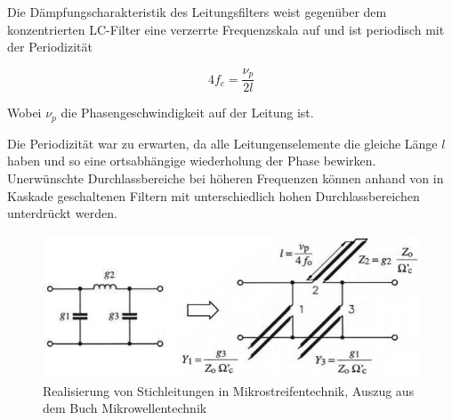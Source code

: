 Die  D\"ampfungscharakteristik  des   Leitungsfilters  weist  gegen\"uber  dem
konzentrierten  LC-Filter eine verzerrte Frequenzskala auf und ist  periodisch
mit der Periodizit\"at

\begin{equation}
    4f_c = \frac{\nu_p}{2l}
\end{equation}

Wobei $\nu_p$ die Phasengeschwindigkeit auf der Leitung ist.

Die Periodizit\"at war  zu  erwarten,  da  alle Leitungenselemente die gleiche
L\"ange $l$ haben und so eine ortsabh\"angige wiederholung der Phase bewirken.
Unerw\"unschte Durchlassbereiche bei  h\"oheren Frequenzen k\"onnen anhand von
in Kaskade geschaltenen Filtern mit unterschiedlich  hohen  Durchlassbereichen
unterdr\"uckt werden.

\begin{figure}[h!]
    \centering
    \includegraphics[width=\imagewidth]{images/LC-zu-Leitungsfilter}
    \caption{Realisierung von Stichleitungen in Mikrostreifentechnik, Auszug aus dem Buch Mikrowellentechnik\cite[p.~26]{ref:baechold}}
    \label{fig:LC-zu-Leitungsfilter}
\end{figure}

